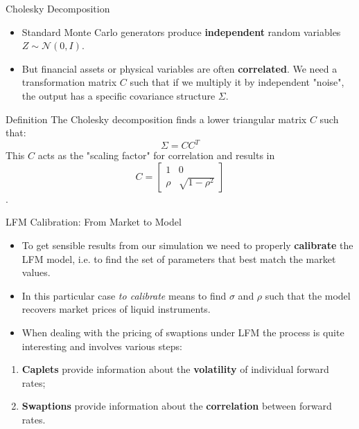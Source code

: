 \documentclass{beamer}
\begin{document}
\begin{frame}{Cholesky Decomposition }
	\begin{itemize}
		\item Standard Monte Carlo generators produce \textbf{independent} random variables $Z \sim \mathcal{N}(0, I)$.
		\item But financial assets or physical variables are often \textbf{correlated}. We need a transformation matrix $C$ such that if we multiply it by independent "noise", the output has a specific covariance structure $\Sigma$.
	\end{itemize}
	
	\begin{block}{Definition}
		The Cholesky decomposition finds a lower triangular matrix $C$ such that:
		$$\Sigma = CC^T$$
		This $C$ acts as the "scaling factor" for correlation and results in
		\begin{equation*}
			C = \begin{bmatrix}
				1 & 0 \\
				\rho & \sqrt{1-\rho^2}
			\end{bmatrix}
		\end{equation*}.
	\end{block}
\end{frame}

\begin{frame}{LFM Calibration: From Market to Model}
	\begin{itemize}
		\item To get sensible results from our simulation we need to properly \textbf{calibrate} the LFM model, i.e. to find the set of parameters that best match the market values.
		\item In this particular case \emph{to calibrate} means to find $\sigma$ and $\rho$ such that the model recovers market prices of liquid instruments.
		\item When dealing with the pricing of swaptions under LFM the process is quite interesting and involves various steps:
	\end{itemize}
	\vfill
	\begin{enumerate}
		\item \textbf{Caplets} provide information about the \textbf{volatility} of individual forward rates;
		\item \textbf{Swaptions} provide information about the \textbf{correlation} between forward rates.
	\end{enumerate}
\end{frame}
\end{document}
